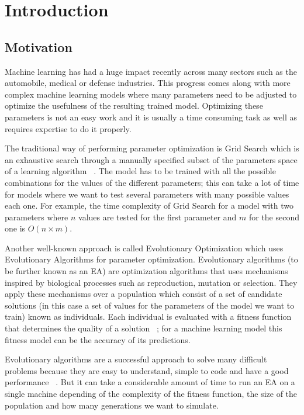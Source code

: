 \chapter{Introduction}
\section{Motivation}
Machine learning has had a huge impact recently across many sectors such as the automobile, medical or defense industries. This progress comes along with more complex machine learning models where many parameters need to be adjusted to optimize the usefulness of the resulting trained model. Optimizing these parameters is not an easy work and it is usually a time consuming task as well as requires expertise to do it properly.

The traditional way of performing parameter optimization is Grid Search which is an exhaustive search through a manually specified subset of the parameters space of a learning algorithm ~\cite{wikipedia-Hyperparameter_optimization}. The model has to be trained with all the possible combinations for the values of the different parameters; this can take a lot of time for models where we want to test several parameters with many possible values each one. For example, the time complexity of Grid Search for a model with two parameters where $n$ values are tested for the first parameter and $m$ for the second one is $O(n \times m)$.

Another well-known approach is called Evolutionary Optimization which uses Evolutionary Algorithms for parameter optimization. Evolutionary algorithms (to be further known as an EA) are optimization algorithms that uses mechanisms inspired by biological processes such as reproduction, mutation or selection. They apply these mechanisms over a population which consist of a set of candidate solutions (in this case a set of values for the parameters of the model we want to train) known as individuals. Each individual is evaluated with a fitness function that determines the quality of a solution ~\cite{wikipedia-Evolutionary_Algorithm}; for a machine learning model this fitness model can be the accuracy of its predictions.

Evolutionary algorithms are a successful approach to solve many difficult problems because they are easy to understand, simple to code and have a good performance ~\cite{Intro-to-EA}. But it can take a considerable amount of time to run an EA on a single machine depending of the complexity of the fitness function, the size of the population and how many generations we want to simulate.

